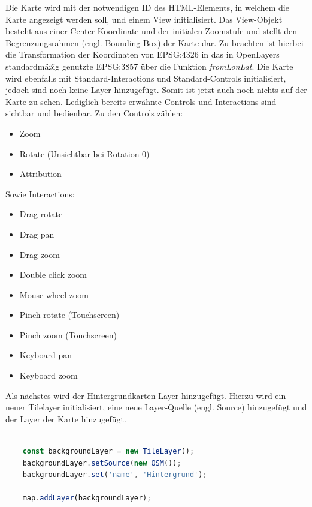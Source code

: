 Die Karte wird mit der notwendigen ID des HTML-Elements, in welchem die Karte angezeigt werden soll, und einem View initialisiert.
Das View-Objekt besteht aus einer Center-Koordinate und der initialen Zoomstufe und stellt den Begrenzungsrahmen (engl. Bounding Box) der Karte dar.
Zu beachten ist hierbei die Transformation der Koordinaten von EPSG:4326 in das in OpenLayers standardmäßig genutzte EPSG:3857 über die Funktion \emph{fromLonLat}.
Die Karte wird ebenfalls mit Standard-Interactions und Standard-Controls initialisiert, jedoch sind noch keine Layer hinzugefügt.
Somit ist jetzt auch noch nichts auf der Karte zu sehen. 
Lediglich bereits erwähnte Controls und Interactions sind sichtbar und bedienbar.
Zu den Controls zählen:

\begin{itemize}
	\item Zoom
	\item Rotate (Unsichtbar bei Rotation 0)
	\item Attribution
\end{itemize}

Sowie Interactions:

\begin{itemize}
	\item Drag rotate
	\item Drag pan
	\item Drag zoom
	\item Double click zoom
	\item Mouse wheel zoom
	\item Pinch rotate (Touchscreen)
	\item Pinch zoom (Touchscreen)
	\item Keyboard pan
	\item Keyboard zoom
\end{itemize}

Als nächstes wird der Hintergrundkarten-Layer hinzugefügt.
Hierzu wird ein neuer Tilelayer initialisiert, eine neue Layer-Quelle (engl. Source) hinzugefügt und der Layer der Karte hinzugefügt.

\begin{lstlisting}[language=JavaScript, caption={Erstellung der Hintergrundkarte}]
	
	const backgroundLayer = new TileLayer();
	backgroundLayer.setSource(new OSM());
	backgroundLayer.set('name', 'Hintergrund');
	
	map.addLayer(backgroundLayer);	
	
\end{lstlisting}

